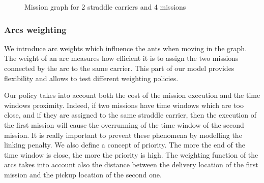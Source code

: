 \documentclass[journal]{IEEEtran}
\let\MYoriglatexcaption\caption
\renewcommand{\caption}[2][\relax]{\MYoriglatexcaption[#2]{#2}}
\begin{document}
\begin{figure}[!h]
	\caption{Mission graph for 2 straddle carriers and 4 missions }
	\label{missiongraph}
\end{figure}



\subsubsection{Arcs weighting}

We introduce arc weights which influence the ants when moving in
the graph. The weight of an arc measures how efficient it is to assign
the two missions connected by the arc to the same carrier. This part
of our model provides flexibility and allows to test different
weighting policies.

Our policy takes into account both the cost of the mission execution and the time
windows proximity. Indeed, if two missions have time windows which are too close, and if they are assigned to the same straddle carrier, then the execution of the first mission will cause the overrunning of the time
window of the second mission. It is really important to prevent these phenomena
by modelling the linking penalty. We also define a concept of priority. The
more the end of the time window is close, the more the priority is high.
The weighting function of the arcs takes into account also the
distance between the delivery location of the first mission and the
pickup location of the second one.\\
\end{document}
